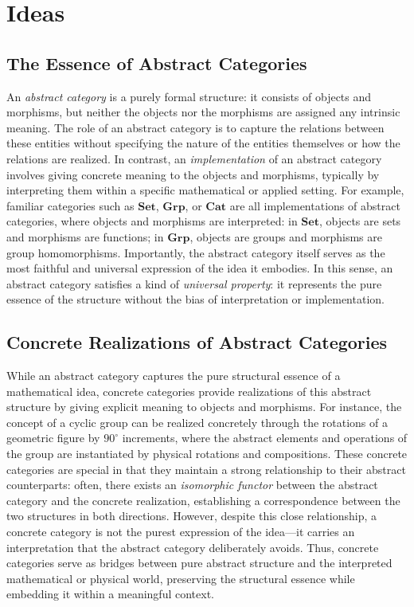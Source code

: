 \newpage

\section{Ideas}

\subsection{The Essence of Abstract Categories}

An \emph{abstract category} is a purely formal structure: it consists of objects and morphisms, but neither the objects nor the morphisms are assigned any intrinsic meaning. The role of an abstract category is to capture the relations between these entities without specifying the nature of the entities themselves or how the relations are realized. In contrast, an \emph{implementation} of an abstract category involves giving concrete meaning to the objects and morphisms, typically by interpreting them within a specific mathematical or applied setting. For example, familiar categories such as $\mathbf{Set}$, $\mathbf{Grp}$, or $\mathbf{Cat}$ are all implementations of abstract categories, where objects and morphisms are interpreted: in $\mathbf{Set}$, objects are sets and morphisms are functions; in $\mathbf{Grp}$, objects are groups and morphisms are group homomorphisms. Importantly, the abstract category itself serves as the most faithful and universal expression of the idea it embodies. In this sense, an abstract category satisfies a kind of \emph{universal property}: it represents the pure essence of the structure without the bias of interpretation or implementation.

\subsection{Concrete Realizations of Abstract Categories}

While an abstract category captures the pure structural essence of a mathematical idea, concrete categories provide realizations of this abstract structure by giving explicit meaning to objects and morphisms. For instance, the concept of a cyclic group can be realized concretely through the rotations of a geometric figure by $90^\circ$ increments, where the abstract elements and operations of the group are instantiated by physical rotations and compositions. These concrete categories are special in that they maintain a strong relationship to their abstract counterparts: often, there exists an \emph{isomorphic functor} between the abstract category and the concrete realization, establishing a correspondence between the two structures in both directions. However, despite this close relationship, a concrete category is not the purest expression of the idea—it carries an interpretation that the abstract category deliberately avoids. Thus, concrete categories serve as bridges between pure abstract structure and the interpreted mathematical or physical world, preserving the structural essence while embedding it within a meaningful context.

